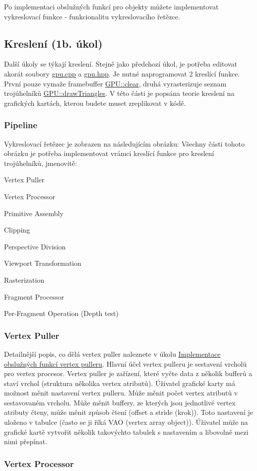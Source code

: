 Po implementaci obslužných funkcí pro objekty můžete implementovat vykreslovací funkce -\/ funkcionalitu vykreslovacího řetězce. \hypertarget{index_Draw}{}\subsection{Kreslení (1b. úkol)}\label{index_Draw}
Další úkoly se týkají kreslení. Stejně jako předchozí úkol, je potřeba editovat akorát soubory \hyperlink{gpu_8cpp}{gpu.\+cpp} a \hyperlink{gpu_8hpp}{gpu.\+hpp}. Je nutné naprogramovat 2 kreslící funkce. První pouze vymaže framebuffer \hyperlink{group__draw__tasks_ga012ff10197fb3e5051b854a0028db31d}{G\+P\+U\+::clear}, druhá vyrasterizuje seznam trojúhelníků \hyperlink{group__draw__tasks_ga127436afbcbda852746dfb9dae885ecf}{G\+P\+U\+::draw\+Triangles}. V této části je popsána teorie kreslení na grafických kartách, kterou budete muset zreplikovat v kódě. \hypertarget{index_Pipeline}{}\subsubsection{Pipeline}\label{index_Pipeline}
Vykreslovací řetězec je zobrazen na následujícím obrázku\+: Všechny části tohoto obrázku je potřeba implementovat vrámci kreslící funkce pro kreslení trojúhelníků, jmenovitě\+: 
\begin{DoxyEnumerate}
\item Vertex Puller 
\item Vertex Processor 
\item Primitive Assembly 
\item Clipping 
\item Perspective Division 
\item Viewport Transformation 
\item Rasterization 
\item Fragment Processor 
\item Per-\/\+Fragment Operation (Depth test) 
\end{DoxyEnumerate}\hypertarget{index_VertexPuller}{}\subsubsection{Vertex Puller}\label{index_VertexPuller}
Detailnější popis, co dělá vertex puller naleznete v úkolu \hyperlink{group__vertexpuller__tasks}{Implementace obslužných funkcí vertex pulleru}. Hlavní účel vertex pulleru je sestavení vrcholů pro vertex procesor. Vertex puller je zařízení, které vyčte data z několik bufferů a staví vrchol (struktura několika vertex atributů). Úživatel grafické karty má možnost měnit nastavení vertex pulleru. Může měnit počet vertex atributů v sestavovaném vrcholu. Může měnit buffery, ze kterých jsou jednotlivé vertex atributy čteny, může měnit způsob čtení (offset a stride (krok)). Toto nastavení je uloženo v tabulce (často se ji říká V\+AO (vertex array object)). Úživatel může na grafické kartě vytvořit několik takovýchto tabulek s nastavením a libovolně mezi nimi přepínat. \hypertarget{index_VertexProcessor}{}\subsubsection{Vertex Processor}\label{index_VertexProcessor}
